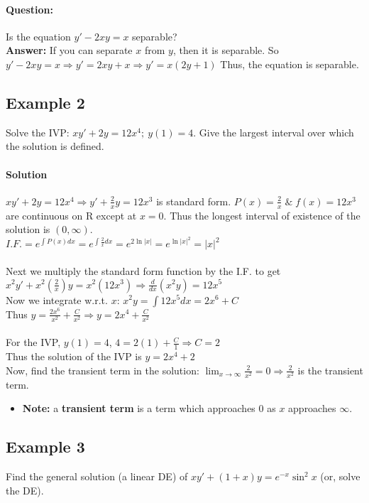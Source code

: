 \documentclass{article}
\begin{document}
\paragraph{Question:} Is the equation $y'-2xy=x$ separable?\\
\textbf{Answer:} If you can separate $x$ from $y$, then it is separable. So $y'-2xy=x\Rightarrow y'=2xy+x\Rightarrow y'=x(2y+1)$
Thus, the equation is separable.


\subsection{Example 2}
Solve the IVP: $xy'+2y=12x^4;\:y(1)=4$. Give the largest interval over which the solution is defined.
\paragraph{Solution} $xy'+2y=12x^4\Rightarrow y'+\frac{2}{x}y=12x^3$ is standard form. $P(x)=\frac{2}{x}\;\&\;f(x)=12x^3$ are continuous on R except at $x=0$. Thus the longest interval of existence of the solution is $(0, \infty)$.
\\$I.F.=e^{\int\!P(x)dx}=e^{\int\frac{2}{x}dx}=e^{2\ln|x|}=e^{\ln{|x|}^2}=|x|^2$
\\\\Next we multiply the standard form function by the I.F. to get $x^2y'+x^2\left(\frac{2}{x}\right)y=x^2(12x^3)\Rightarrow \frac{d}{dx}(x^2y)=12x^5$
\\Now we integrate w.r.t. $x$: $x^2y=\int 12x^5dx=2x^6+C$
\\Thus $y=\frac{2x^6}{x^2}+\frac{C}{x^2}\Rightarrow y=2x^4+\frac{C}{x^2}$
\\\\For the IVP, $y(1)=4$, $4=2(1)+\frac{C}{1}\Rightarrow C=2$
\\Thus the solution of the IVP is $y=2x^4+2$
\\Now, find the transient term in the solution: $\lim_{x \to \infty}\frac{2}{x^2}=0\Rightarrow\frac{2}{x^2}$ is the transient term.
\begin{itemize}
    \item \textbf{Note:} a \textbf{transient term} is a term which approaches 0 as $x$ approaches $\infty$.
\end{itemize}

\subsection{Example 3}
Find the general solution (a linear DE) of $xy'+(1+x)y=e^{-x}\sin^2x$ (or, solve the DE).
\end{document}
